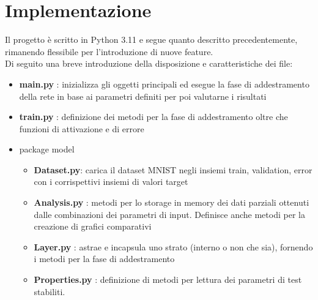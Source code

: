 \chapter{Implementazione}
Il progetto è scritto in Python 3.11 e segue quanto descritto precedentemente, rimanendo flessibile per l'introduzione di nuove feature. \\
Di seguito una breve introduzione della disposizione e caratteristiche dei file:
\begin{itemize}
    \item \textbf{main.py} : inizializza gli oggetti principali ed esegue la fase di addestramento della rete in base ai parametri definiti per poi valutarne i risultati
    \item \textbf{train.py} : definizione dei metodi per la fase di addestramento oltre che funzioni di attivazione e di errore
    \item package model
    \begin{itemize}
        \item \textbf{Dataset.py}: carica il dataset MNIST negli insiemi train, validation, error con i corrispettivi insiemi di valori target 
        \item \textbf{Analysis.py} : metodi per lo storage in memory dei dati parziali ottenuti dalle combinazioni dei parametri di input. Definisce anche metodi per la creazione di grafici comparativi
        \item \textbf{Layer.py} : astrae e incapsula uno strato (interno o non che sia), fornendo i metodi per la fase di addestramento
        \item \textbf{Properties.py} : definizione di metodi per lettura dei parametri di test stabiliti.
    \end{itemize}
\end{itemize}

